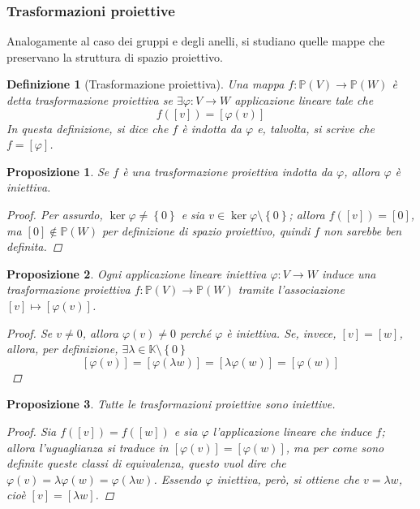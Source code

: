 \documentclass[12pt]{scrartcl}
\theoremstyle{style}
\newtheorem{definizione}{Definizione}[section]
\newtheorem{prop}{Proposizione}[section]
\numberwithin{equation}{subsection}
\begin{document}
\subsubsection{Trasformazioni proiettive}
Analogamente al caso dei gruppi e degli anelli, si studiano quelle mappe che preservano la struttura di spazio proiettivo.
\begin{definizione}
	[Trasformazione proiettiva]
	Una mappa $f : \mathbb{P}(V)\to \mathbb{P}(W)$ \`e detta \textit{trasformazione proiettiva} se $\exists \varphi : V \to W$ applicazione lineare tale che
	\[
		f([v]) = [\varphi (v)]
	\] 
	In questa definizione, si dice che $f$ \`e \textit{indotta} da $\varphi $ e, talvolta, si scrive che $f = [\varphi ]$.
\end{definizione}
\begin{prop}
	Se $f$ \`e una trasformazione proiettiva indotta da $\varphi $, allora $\varphi $ \`e iniettiva.
	\begin{proof}
		Per assurdo, $\operatorname{ker} \varphi  \neq \left\{ 0 \right\} $ e sia $v \in \operatorname{ker} \varphi \setminus \left\{ 0 \right\} $; allora $f([v]) = [0]$, ma $[0] \not \in \mathbb{P}(W)$ per definizione di spazio proiettivo, quindi $f$ non sarebbe ben definita.
	\end{proof}
\end{prop}
\begin{prop}
	Ogni applicazione lineare iniettiva $\varphi :V\to W$ induce una trasformazione proiettiva $f: \mathbb{P}(V) \to \mathbb{P}(W)$ tramite l'associazione $[v] \mapsto [\varphi (v)]$.
	\begin{proof}
		Se $v\neq 0$, allora $\varphi (v) \neq 0$ perch\'e $\varphi $ \`e iniettiva. 
		Se, invece, $[v] = [w]$, allora, per definizione, $\exists \lambda  \in \mathbb{K}\setminus \left\{ 0 \right\}$
		\[
			[\varphi (v) ] = [\varphi (\lambda w)] = [\lambda \varphi (w)] = [\varphi (w)]
		\] 
		
	\end{proof}
\end{prop}
\begin{prop}
	Tutte le trasformazioni proiettive sono iniettive.
	\begin{proof}
		Sia $f([v]) = f([w])$ e sia $\varphi $ l'applicazione lineare che induce $f$; allora l'uguaglianza si traduce in $[\varphi (v)]=[\varphi (w)]$, ma per come sono definite queste classi di equivalenza, questo vuol dire che $\varphi (v) = \lambda \varphi (w) = \varphi (\lambda w)$.
		Essendo $\varphi $ iniettiva, per\`o, si ottiene che $v = \lambda w$, cio\`e $[v] = [\lambda w]$.
	\end{proof}
\end{prop}
\end{document}
